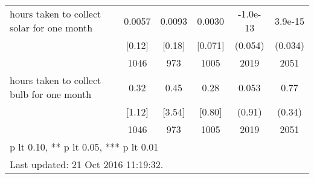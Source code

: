 \begin{table}[htbp]
\begin{tabular*}{0.9\hsize}{@{\hskip\tabcolsep\extracolsep\fill}l*{1}{ccccc}}
hours taken to collect solar for one month&   0.0057&   0.0093&   0.0030& -1.0e-13         &  3.9e-15         \\
                                &   [0.12]&   [0.18]&  [0.071]&  (0.054)         &  (0.034)         \\
                                &     1046&      973&     1005&     2019         &     2051         \\
hours taken to collect bulb for one month&     0.32&     0.45&     0.28&    0.053         &     0.77\sym{**} \\
                                &   [1.12]&   [3.54]&   [0.80]&   (0.91)         &   (0.34)         \\
                                &     1046&      973&     1005&     2019         &     2051         \\
\bottomrule
\multicolumn{6}{l}{\footnotesize * p lt 0.10, ** p lt 0.05, *** p lt 0.01}\\
\multicolumn{6}{l}{\footnotesize Last updated: 21 Oct 2016 11:19:32.}\\
\end{tabular*}
\end{table}
